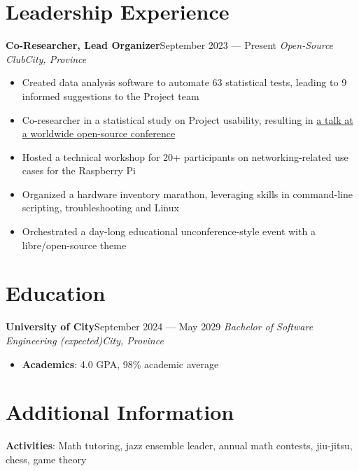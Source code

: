 \documentclass{article}
\newcommand{\newrole}[4]{
    {\normalfont\textbf{#1}\hfill#3}
    \newline
    \textit{#2}\hfill\textit{#4}
}
\newenvironment{bulletpoints}{\begin{itemize}\setlength\itemsep{-0.2em}}{\end{itemize}}
\begin{document}
\section*{Leadership Experience}
\newrole{Co-Researcher, Lead Organizer}{Open-Source Club}{September 2023 --- Present}{City, Province}
\begin{bulletpoints}
    \item Created data analysis software to automate 63 statistical tests, leading to 9 informed suggestions to the Project team
    \item Co-researcher in a statistical study on Project usability, resulting in \href{https://example.com}{a talk at a worldwide open-source conference}
    \item Hosted a technical workshop for 20+ participants on networking-related use cases for the Raspberry Pi
    \item Organized a hardware inventory marathon, leveraging skills in command-line scripting, troubleshooting and Linux
    \item Orchestrated a day-long educational unconference-style event with a libre/open-source theme
\end{bulletpoints}

\section*{Education}

\newrole{University of City}{Bachelor of Software Engineering (expected)}{September 2024 --- May 2029}{City, Province}
\begin{bulletpoints}
    \vspace*{-2pt}
    \item {\bfseries Academics}: 4.0 GPA, 98\% academic average
\end{bulletpoints}

\section*{Additional Information}
{\bfseries Activities}: Math tutoring, jazz ensemble leader, annual math contests, jiu-jitsu, chess, game theory
\end{document}
